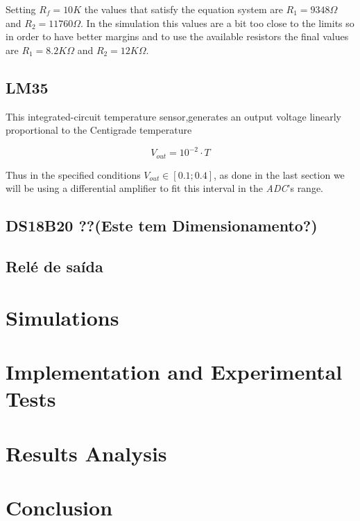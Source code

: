 \documentclass[12pt]{article}
\begin{document}
    Setting $R_f = 10K$ the values that satisfy the equation system are $R_1 = 9348 \Omega$ and $R_2 = 11760 \Omega$.
    In the simulation this values are a bit too close to the limits so in order to have better margins and to use the available resistors
    the final values are  $R_1 = 8.2K \Omega$ and $R_2 = 12K \Omega$.

    

\subsection{LM35}

    This integrated-circuit temperature sensor,generates an output
voltage linearly proportional to the Centigrade temperature

$$V_{out} = 10^{-2}\cdot T$$

Thus in the specified conditions $V_{out}\in[0.1;0.4]$, as done in the last section we will be using a differential amplifier to fit this interval in the \textit{ADC}'s range.

\subsection{DS18B20 ??(Este tem Dimensionamento?)}
\subsection{Relé de saída }

\section{Simulations}

\section{Implementation and Experimental Tests}

\section{Results Analysis}

\section{Conclusion}
\end{document}
